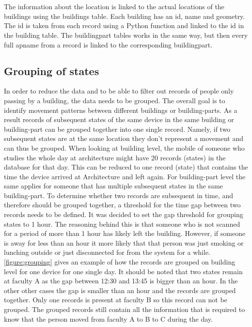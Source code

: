 \\\\
The information about the location is linked to the actual locations of the buildings using the buildings table. Each building has an id, name and geometry. The id is taken from each record using a Python function and linked to the id in the building table. The buildingpart tables works in the same way, but then every full apname from a record is linked to the corresponding buildingpart.

\subsection{Grouping of states}\label{grouping}
In order to reduce the data and to be able to filter out records of people only passing by a building, the data needs to be grouped. The overall goal is to identify movement patterns between different buildings or building-parts. As a result records of subsequent states of the same device in the same building or building-part can be grouped together into one single record. Namely, if two subsequent states are at the same location they don’t represent a movement and can thus be grouped. When looking at building level, the mobile of someone who studies the whole day at architecture might have 20 records (states) in the database for that day. This can be reduced to one record (state) that contains the time the device arrived at Architecture and left again. For building-part level the same applies for someone that has multiple subsequent states in the same building-part. To determine whether two records are subsequent in time, and therefore should be grouped together, a threshold for the time gap between two records needs to be defined. It was decided to set the gap threshold for grouping states to 1 hour. The reasoning behind this is that someone who is not scanned for a period of more than 1 hour has likely left the building. However, if someone is away for less than an hour it more likely that that person was just smoking or lunching outside or just disconnected for from the system for a while. \autoref{figure:grouping} gives an example of how the records are grouped on building level for one device for one single day. It should be noted that two states remain at faculty A as the gap between 12:30 and 13:45 is bigger than an hour. In the other other cases the gap is smaller than an hour and the records are grouped together. Only one records is present at faculty B so this record can not be grouped. The grouped records still contain all the information that is required to know that the person moved from faculty A to B to C during the day. 

